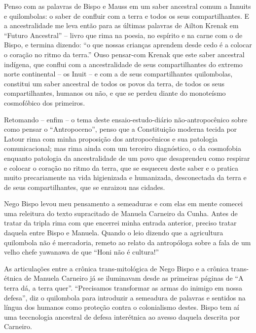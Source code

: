 Penso com as palavras de Bispo e Mauss em um saber ancestral comum a Innuits e quilombolas: o saber de confluir com a terra e todos os seus compartilhantes. E a ancestralidade me leva então para as últimas palavras de Ailton Krenak em \enquote{Futuro Ancestral} -- livro que rima na poesia, no espírito e na carne com o de Bispo, e termina dizendo: \enquote{o que nossas crianças aprendem desde cedo é a colocar o coração no ritmo da terra.} Ouso pensar-com Krenak que este saber ancestral indígena, que conflui com a ancestralidade de seus compartilhantes do extremo norte continental -- os Inuit -- e com a de seus compartilhantes quilombolas, constitui um saber ancestral de todos os povos da terra, de todos os seus compartilhantes, humanos ou não, e que se perdeu diante do monoteísmo cosmofóbico dos primeiros.

Retomando -- enfim -- o tema deste ensaio-estudo-diário não-antropocênico sobre como pensar o \enquote{Antropoceno}, penso que a Constituição moderna tecida por Latour rima com minha proposição dos antropocênicos e sua patologia comunicacional; mas rima ainda com um terceiro diagnóstico, o da cosmofobia enquanto patologia da ancestralidade de um povo que desaprendeu como respirar e colocar o coração no ritmo da terra, que se esqueceu deste saber e o pratica muito precariamente na vida higienizada e humanizada, desconectada da terra e de seus compartilhantes, que se enraizou nas cidades.


Nego Bispo levou meu pensamento a semeaduras e com elas em mente comecei uma releitura do texto supracitado de Manuela Carneiro da Cunha. Antes de tratar da tripla rima com que encerrei minha entrada anterior, preciso tratar daquela entre Bispo e Manuela. Quando o leio dizendo que a agricultura quilombola não é mercadoria, remeto ao relato da antropóloga sobre a fala de um velho chefe yawanawa de que \enquote{Honi não é cultura!}

As articulações entre a crônica trans-mitológica de Nego Bispo e a crônica trans-étnica de Manuela Carneiro já se iluminavam desde as primeiras páginas de \enquote{A terra dá, a terra quer}. \enquote{Precisamos transformar as armas do inimigo em nossa defesa}, diz o quilombola para introduzir a semeadura de palavras e sentidos na língua dos humanos como proteção contra o colonialismo destes. Bispo tem aí uma teccnologia ancestral de defesa interétnica ao avesso daquela descrita por Carneiro.

